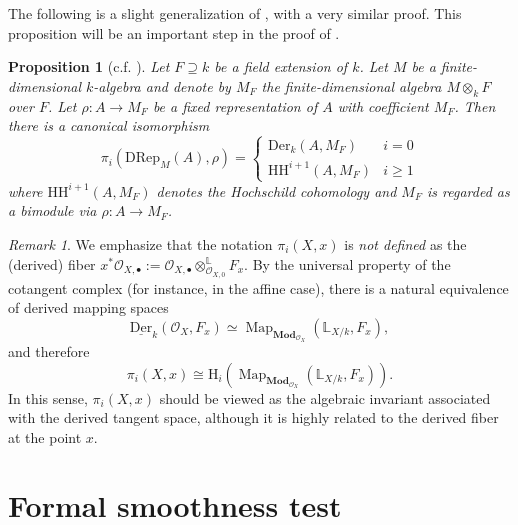 \documentclass{article}
\numberwithin{equation}{section} %
\theoremstyle{plain}
\newtheorem{proposition}[theorem]{Proposition}
\theoremstyle{definition}
\theoremstyle{remark}
\newtheorem{remark}{Remark}
\begin{document}
The following  is a slight generalization of \cite[Proposition 7]{BFR14}, with a very similar proof.
This proposition will be an important step in the proof of .

\begin{proposition}[c.f. {\cite[Proposition 7]{BFR14}}]\label{Proposition_HigherDRepAtPoint}
Let $F\supseteq k$ be a field extension of $k$.
Let $M$ be a finite-dimensional $k$-algebra and denote by $M_F$ the finite-dimensional algebra $M\otimes_kF$ over $F$.
Let $\rho:A\to M_F$ be a fixed representation of $A$ with coefficient $M_F$.
Then there is a canonical isomorphism
\begin{equation*}
\pi_i(\mathrm{DRep}_M(A),\rho)=\left\{\begin{matrix}\mathrm{Der}_k(A,M_F)&i=0\\ \mathrm{HH}^{i+1}(A,M_F)&i\geq1
\end{matrix}\right.
\end{equation*}
where $\mathrm{HH}^{i+1}(A,M_F)$ denotes the Hochschild cohomology and $M_F$ is regarded as a bimodule via $\rho:A\to M_F$.
\end{proposition}

\begin{remark}
We emphasize that the notation $\pi_i(X,x)$ is \emph{not defined} as the (derived) fiber $x^*\mathcal{O}_{X,\bullet}:=\mathcal{O}_{X,\bullet}\otimes_{\mathcal{O}_{X,0}}^{\mathbb{L}}F_x$.
By the universal property of the cotangent complex (for instance, \cite[Proposition 1.2.1.2]{TV08} in the affine case), there is a natural equivalence of derived mapping spaces
\begin{equation*}
\underline{\mathrm{Der}}_k(\mathcal{O}_{X},F_x)\simeq 
\operatorname{Map}_{\mathbf{Mod}_{\mathcal{O}_{X}}}(\mathbb{L}_{X/k},F_x),
\end{equation*}
and therefore
\begin{equation}\label{Eq_MappingSpTranslation}
\pi_i(X,x)\cong\mathrm{H}_i(\operatorname{Map}_{\mathbf{Mod}_{\mathcal{O}_{X}}}(\mathbb{L}_{X/k},F_x)).
\end{equation}
In this sense, $\pi_i(X,x)$ should be viewed as the algebraic invariant associated with the derived tangent space, although it is highly related to the derived fiber at the point $x$.
\end{remark}

\section{Formal smoothness test}\label{Sec_FormalSm}
\end{document}
